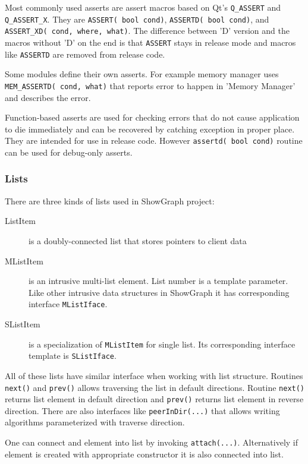 \documentclass[11pt,twoside,a4paper]{article}
\begin{document}
Most commonly used asserts are assert macros based on Qt's \lstinline{Q_ASSERT} and \lstinline{Q_ASSERT_X}. They are \lstinline{ASSERT( bool cond)}, \lstinline{ASSERTD( bool cond)}, and \lstinline{ASSERT_XD( cond, where, what)}. The difference between 'D' version and the macros without 'D' on the end is that \lstinline{ASSERT} stays in release mode and macros like \lstinline{ASSERTD} are removed from release code. 

Some modules define their own asserts. For example memory manager uses  \lstinline{MEM_ASSERTD( cond, what)} that reports error to happen in 'Memory Manager' and describes the error.

Function-based asserts are used for checking errors that do not cause application to die immediately and can be recovered by catching exception in proper place. They are intended for use in release code. However \lstinline{assertd( bool cond)} routine can be used for debug-only asserts.

\subsubsection{Lists}
There are three kinds of lists used in ShowGraph project:
\begin{description}
\item[ListItem] is a doubly-connected list that stores pointers to client data
\item[MListItem] is an intrusive multi-list element. List number is a template parameter. Like other intrusive data structures in ShowGraph it has corresponding interface \lstinline{MListIface}.
\item[SListItem] is a specialization of \lstinline{MListItem} for single list. Its corresponding interface template is \lstinline{SListIface}.
\end{description}

All of these lists have similar interface when working with list structure. Routines \lstinline{next()} and \lstinline{prev()} allows traversing the list in default directions. Routine \lstinline{next()} returns list element in default direction and \lstinline{prev()} returns list element in reverse direction. There are also interfaces like \lstinline{peerInDir(...)} that allows writing algorithms parameterized with traverse direction. 

One can connect and element into list by invoking \lstinline{attach(...)}. Alternatively if element is created with appropriate constructor it is also connected into list.
\end{document}
